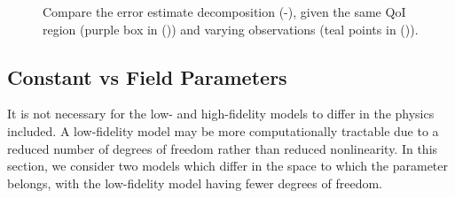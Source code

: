 \begin{figure}[htbp]
\centering
{} 
  \caption{Compare the error estimate decomposition (\protect{}-\protect{}), given the same QoI region (purple box in (\protect{})) and varying observations (teal points in (\protect{})).}
  \label{fig:dataStudy}
\end{figure}
\subsection{Constant vs Field Parameters} \label{sec:constvfield}
It is not necessary for the low- and high-fidelity models to differ in the physics included. A low-fidelity model may be more computationally tractable due to a reduced number of degrees of freedom rather than reduced nonlinearity. In this section, we consider two models which differ in the space to which the parameter belongs, with the low-fidelity model having fewer degrees of freedom.
